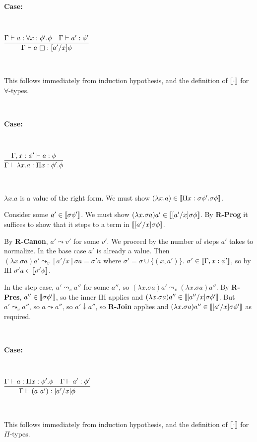\documentclass[copyright]{eptcs}
\newcommand{\leadstov}[0]{\leadsto_v}
\newcommand{\impapp}[0]{\raisebox{-0.2ex}{$\square$}}
\newcommand{\interp}[1]{[\negthinspace[#1]\negthinspace]}
\begin{document}
\ 

\noindent \textbf{Case:}

\

$\infer{\Gamma \vdash a\ \impapp : [a'/x]\phi}
 {\Gamma \vdash a:\forall x:\phi'.\phi & \Gamma \vdash a':\phi'}$

\ 

\noindent This follows immediately from induction hypothesis, and the
definition of $\interp{\cdot}$ for $\forall$-types.

\ 

\noindent \textbf{Case:}

\

$\infer{\Gamma \vdash \lambda x.a : \Pi x:\phi'.\phi}
      {\Gamma, x:\phi' \vdash a:\phi}$

\ 

\noindent $\lambda x.a$ is a value of the right form.  We must show
$(\lambda x. a) \in \interp{\Pi x:\sigma\phi'.\sigma\phi}$.


Consider some $a' \in \interp{\sigma \phi'}$. We must show $(\lambda x.\sigma a) a' \in
\interp{[a'/x]\sigma \phi}$. By \textbf{R-Prog} it suffices to show that it steps to a term in $\interp{[a'/x]\sigma \phi}$.

By \textbf{R-Canon}, $a' \leadsto v'$ for some $v'$. We proceed by the number
of steps $a'$ takes to normalize. In the base case $a'$ is already a
value. Then $(\lambda x. \sigma a) a' \leadstov [a'/x]\sigma a = \sigma' a$ where $\sigma' = \sigma \cup \{(x,a')\}$.
$\sigma' \in \interp{\Gamma, x:\phi'}$, so by IH $\sigma' a \in \interp{\sigma'\phi}$. 

In the step case, $a' \leadstov a''$ for some $a''$, so $(\lambda x.\sigma a) a' \leadstov (\lambda x.\sigma a) a''$. By \textbf{R-Pres}, $a'' \in \interp{\sigma \phi'}$, so the inner IH applies and $(\lambda x.\sigma a) a'' \in \interp{[a''/x]\sigma\phi'}$. But $a' \leadstov a''$, so $a \leadsto a''$, so $a' \downarrow a''$, so \textbf{R-Join} applies and $(\lambda x.\sigma a) a'' \in \interp{[a'/x]\sigma\phi'}$ as required.

\ 

\noindent \textbf{Case:}

\

$\infer{\Gamma \vdash (a\ a') : [a'/x]\phi}{\Gamma \vdash a:\Pi x:\phi'.\phi & \Gamma\vdash a':\phi'}$

\ 

\noindent This follows immediately from induction hypothesis, and the
definition of $\interp{\cdot}$ for $\Pi$-types.
\end{document}
